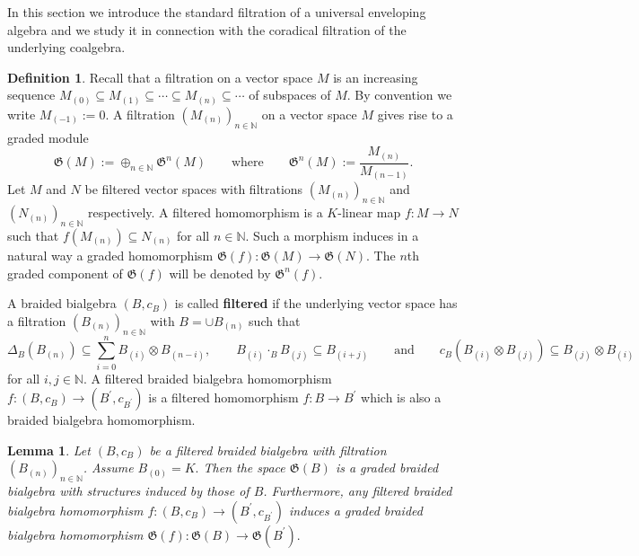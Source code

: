 \documentclass[english]{amsart}
\numberwithin{equation}{section}
\numberwithin{figure}{section}
\theoremstyle{plain}
\theoremstyle{definition}
\newtheorem{defn}[thm]{Definition}
\theoremstyle{definition}
\theoremstyle{remark}
\theoremstyle{remark}
\theoremstyle{plain}
\newtheorem{lem}[thm]{Lemma}
\theoremstyle{plain}
\theoremstyle{plain}
\begin{document}
In this section we introduce the standard filtration of a universal
enveloping algebra and we study it in connection with the coradical
filtration of the underlying coalgebra.
\begin{defn}
Recall that a filtration on a vector space $M$ is an increasing sequence
$M_{\left(0\right)}\subseteq M_{\left(1\right)}\subseteq\cdots\subseteq M_{\left(n\right)}\subseteq\cdots$
of subspaces of $M$. By convention we write $M_{(-1)}:=0$. A filtration
$\left(M_{\left(n\right)}\right)_{n\in\mathbb{N}}$ on a vector space
$M$ gives rise to a graded module \[
\mathfrak{G}\left(M\right):=\oplus_{n\in\mathbb{N}}\mathfrak{G}^{n}\left(M\right)\qquad\textrm{where}\qquad\mathfrak{G}^{n}\left(M\right):=\frac{M_{\left(n\right)}}{M_{\left(n-1\right)}}.\]
Let $M$ and $N$ be filtered vector spaces with filtrations $\left(M_{\left(n\right)}\right)_{n\in\mathbb{N}}$
and $\left(N_{\left(n\right)}\right)_{n\in\mathbb{N}}$ respectively.
A filtered homomorphism is a $K$-linear map $f:M\rightarrow N$ such
that $f\left(M_{\left(n\right)}\right)\subseteq N_{\left(n\right)}$
for all $n\in\mathbb{N}$. Such a morphism induces in a natural way
a graded homomorphism $\mathfrak{G}\left(f\right):\mathfrak{G}\left(M\right)\rightarrow\mathfrak{G}\left(N\right).$
The $n$th graded component of $\mathfrak{G}\left(f\right)$ will
be denoted by $\mathfrak{G}^{n}\left(f\right)$.

A braided bialgebra $\left(B,c_{B}\right)$ is called \textbf{filtered}
if the underlying vector space has a filtration $\left(B_{\left(n\right)}\right)_{n\in\mathbb{N}}$
with $B=\cup B_{\left(n\right)}$ such that \[
\Delta_{B}\left(B_{\left(n\right)}\right)\subseteq\sum\limits _{i=0}^{n}B_{\left(i\right)}\otimes B_{\left(n-i\right)},\qquad B_{\left(i\right)}\cdot_{B}B_{\left(j\right)}\subseteq B_{\left(i+j\right)}\qquad\text{and}\qquad c_{B}\left(B_{\left(i\right)}\otimes B_{\left(j\right)}\right)\subseteq B_{\left(j\right)}\otimes B_{\left(i\right)}\]
for all $i,j\in\mathbb{N}$. A filtered braided bialgebra homomorphism
$f:\left(B,c_{B}\right)\rightarrow\left(B^{\prime},c_{B^{\prime}}\right)$
is a filtered homomorphism $f:B\rightarrow B^{\prime}$ which is also
a braided bialgebra homomorphism.\end{defn}
\begin{lem}
\label{lem: graded of filtered}Let $\left(B,c_{B}\right)$ be a filtered
braided bialgebra with filtration $\left(B_{\left(n\right)}\right)_{n\in\mathbb{N}}$.
Assume $B_{\left(0\right)}=K.$ Then the space $\mathfrak{G}\left(B\right)$
is a graded braided bialgebra with structures induced by those of
$B$. Furthermore, any filtered braided bialgebra homomorphism $f:\left(B,c_{B}\right)\rightarrow\left(B^{\prime},c_{B^{\prime}}\right)$
induces a graded braided bialgebra homomorphism $\mathfrak{G}\left(f\right):\mathfrak{G}\left(B\right)\rightarrow\mathfrak{G}\left(B^{\prime}\right).$ \end{lem}
\end{document}
